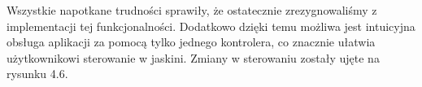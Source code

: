 Wszystkie napotkane trudności sprawiły, że ostatecznie zrezygnowaliśmy z implementacji tej funkcjonalności. Dodatkowo dzięki temu możliwa jest intuicyjna obsługa aplikacji za pomocą tylko jednego kontrolera, co znacznie ułatwia użytkownikowi sterowanie w jaskini. Zmiany w sterowaniu zostały ujęte na rysunku 4.6.


